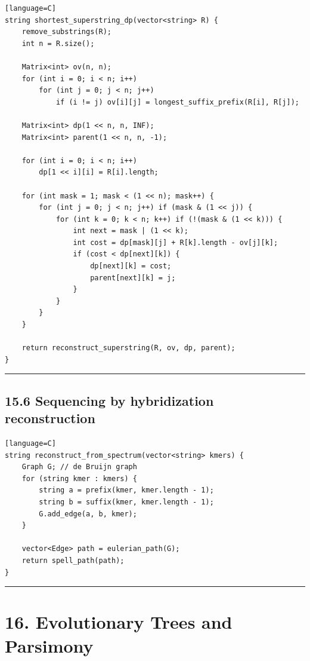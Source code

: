 \documentclass[11pt]{article}
\begin{document}
\begin{verbatim}[language=C]
string shortest_superstring_dp(vector<string> R) {
    remove_substrings(R);
    int n = R.size();

    Matrix<int> ov(n, n);
    for (int i = 0; i < n; i++)
        for (int j = 0; j < n; j++)
            if (i != j) ov[i][j] = longest_suffix_prefix(R[i], R[j]);

    Matrix<int> dp(1 << n, n, INF);
    Matrix<int> parent(1 << n, n, -1);

    for (int i = 0; i < n; i++)
        dp[1 << i][i] = R[i].length;

    for (int mask = 1; mask < (1 << n); mask++) {
        for (int j = 0; j < n; j++) if (mask & (1 << j)) {
            for (int k = 0; k < n; k++) if (!(mask & (1 << k))) {
                int next = mask | (1 << k);
                int cost = dp[mask][j] + R[k].length - ov[j][k];
                if (cost < dp[next][k]) {
                    dp[next][k] = cost;
                    parent[next][k] = j;
                }
            }
        }
    }

    return reconstruct_superstring(R, ov, dp, parent);
}
\end{verbatim}

\begin{center}\rule{0.5\linewidth}{0.5pt}\end{center}

\subsection{15.6 Sequencing by hybridization reconstruction}\label{sequencing-by-hybridization-reconstruction}

\begin{verbatim}[language=C]
string reconstruct_from_spectrum(vector<string> kmers) {
    Graph G; // de Bruijn graph
    for (string kmer : kmers) {
        string a = prefix(kmer, kmer.length - 1);
        string b = suffix(kmer, kmer.length - 1);
        G.add_edge(a, b, kmer);
    }

    vector<Edge> path = eulerian_path(G);
    return spell_path(path);
}
\end{verbatim}

\begin{center}\rule{0.5\linewidth}{0.5pt}\end{center}

\section{16. Evolutionary Trees and Parsimony}\label{evolutionary-trees-and-parsimony}
\end{document}
